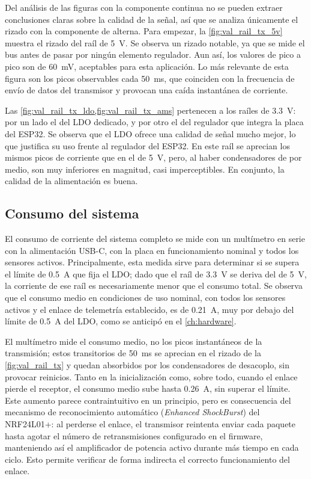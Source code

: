 Del análisis de las figuras con la componente continua no se pueden extraer conclusiones claras sobre la calidad de la señal, así que se analiza únicamente el rizado con la componente de alterna. Para empezar, la \cref{fig:val_rail_tx_5v} muestra el rizado del raíl de \SI{5}{\volt}. Se observa un rizado notable, ya que se mide el bus antes de pasar por ningún elemento regulador. Aun así, los valores de pico a pico son de \SI{60}{\milli\volt}, aceptables para esta aplicación. Lo más relevante de esta figura son los picos observables cada \SI{50}{\milli\second}, que coinciden con la frecuencia de envío de datos del transmisor y provocan una caída instantánea de corriente.

Las \cref{fig:val_rail_tx_ldo,fig:val_rail_tx_ams} pertenecen a los raíles de \SI{3.3}{\volt}: por un lado el del LDO dedicado, y por otro el del regulador que integra la placa del ESP32. Se observa que el LDO ofrece una calidad de señal mucho mejor, lo que justifica su uso frente al regulador del ESP32. En este raíl se aprecian los mismos picos de corriente que en el de \SI{5}{\volt}, pero, al haber condensadores de por medio, son muy inferiores en magnitud, casi imperceptibles. En conjunto, la calidad de la alimentación es buena.

\subsection{Consumo del sistema}
\label{sec:val_consumo}

El consumo de corriente del sistema completo se mide con un multímetro en serie
con la alimentación USB-C, con la placa en funcionamiento nominal y todos los sensores activos. Principalmente, esta medida sirve para determinar si se supera el límite de \SI{0.5}{\ampere} que fija el LDO; dado que el raíl de \SI{3.3}{\volt} se deriva del de \SI{5}{\volt}, la corriente de ese raíl es necesariamente menor que el consumo total. Se observa que el consumo medio en condiciones de uso nominal, con todos los sensores activos y el enlace de telemetría establecido, es de \SI{0.21}{\ampere}, muy por debajo del límite de \SI{0.5}{\ampere} del LDO, como se anticipó en el \cref{ch:hardware}.

El multímetro mide el consumo medio, no los picos instantáneos de la transmisión; estos transitorios de \SI{50}{\milli\second} se aprecian en el rizado de la \cref{fig:val_rail_tx} y quedan absorbidos por los condensadores de desacoplo, sin provocar reinicios. Tanto en la inicialización como, sobre todo, cuando el enlace pierde el receptor, el consumo medio sube hasta \SI{0.26}{\ampere}, sin superar el límite. Este aumento parece contraintuitivo en un principio, pero es consecuencia del mecanismo de reconocimiento automático (\textit{Enhanced ShockBurst}) del NRF24L01+: al perderse el enlace, el transmisor reintenta enviar cada paquete hasta agotar el número de retransmisiones configurado en el firmware, manteniendo así el amplificador de potencia activo durante más tiempo en cada ciclo. Esto permite verificar de forma indirecta el correcto funcionamiento del enlace.


